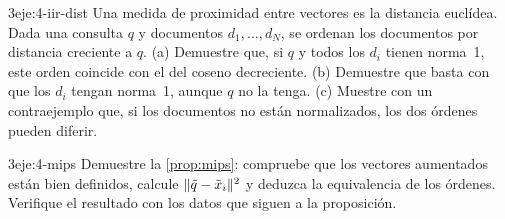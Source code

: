 \begin{ejercicio}{3}{eje:4-iir-dist}
Una medida de proximidad entre vectores es la distancia euclídea. Dada una consulta $q$ y documentos $d_1,\dots,d_N$, se ordenan los documentos por distancia creciente a $q$. (a) Demuestre que, si $q$ y todos los $d_i$ tienen norma~1, este orden coincide con el del coseno decreciente. (b) Demuestre que basta con que los $d_i$ tengan norma~1, aunque $q$ no la tenga. (c) Muestre con un contraejemplo que, si los documentos no están normalizados, los dos órdenes pueden diferir.
\end{ejercicio}

\begin{ejercicio}{3}{eje:4-mips}
Demuestre la \cref{prop:mips}: compruebe que los vectores aumentados están bien definidos, calcule $\lVert\tilde q-\tilde x_i\rVert^{2}$ y deduzca la equivalencia de los órdenes. Verifique el resultado con los datos que siguen a la proposición.
\end{ejercicio}
